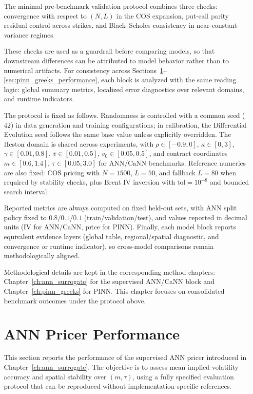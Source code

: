 The minimal pre-benchmark validation protocol combines three checks: convergence with respect to \((N,L)\) in the COS expansion, put-call parity residual control across strikes, and Black--Scholes consistency in near-constant-variance regimes.

These checks are used as a guardrail before comparing models, so that downstream differences can be attributed to model behavior rather than to numerical artifacts. For consistency across Sections~\ref{sec:ann_pricer_performance}--\ref{sec:pinn_greeks_performance}, each block is analyzed with the same reading logic: global summary metrics, localized error diagnostics over relevant domains, and runtime indicators.

The protocol is fixed as follows. Randomness is controlled with a common seed (\(42\)) in data generation and training configurations; in calibration, the Differential Evolution seed follows the same base value unless explicitly overridden. The Heston domain is shared across experiments, with \(\rho\in[-0.9,0]\), \(\kappa\in[0,3]\), \(\gamma\in[0.01,0.8]\), \(\bar v\in[0.01,0.5]\), \(v_0\in[0.05,0.5]\), and contract coordinates \(m\in[0.6,1.4]\), \(\tau\in[0.05,3.0]\) for ANN/CaNN benchmarks. Reference numerics are also fixed: COS pricing with \(N=1500\), \(L=50\), and fallback \(L=80\) when required by stability checks, plus Brent IV inversion with \(\mathrm{tol}=10^{-8}\) and bounded search interval.

Reported metrics are always computed on fixed held-out sets, with ANN split policy fixed to \(0.8/0.1/0.1\) (train/validation/test), and values reported in decimal units (IV for ANN/CaNN, price for PINN). Finally, each model block reports equivalent evidence layers (global table, regional/spatial diagnostic, and convergence or runtime indicator), so cross-model comparisons remain methodologically aligned.

Methodological details are kept in the corresponding method chapters: Chapter~\ref{ch:ann_surrogate} for the supervised ANN/CaNN block and Chapter~\ref{ch:pinn_greeks} for PINN. This chapter focuses on consolidated benchmark outcomes under the protocol above.

\section{ANN Pricer Performance}
\label{sec:ann_pricer_performance}
This section reports the performance of the supervised ANN pricer introduced in Chapter~\ref{ch:ann_surrogate}. The objective is to assess mean implied-volatility accuracy and spatial stability over \((m,\tau)\), using a fully specified evaluation protocol that can be reproduced without implementation-specific references.

